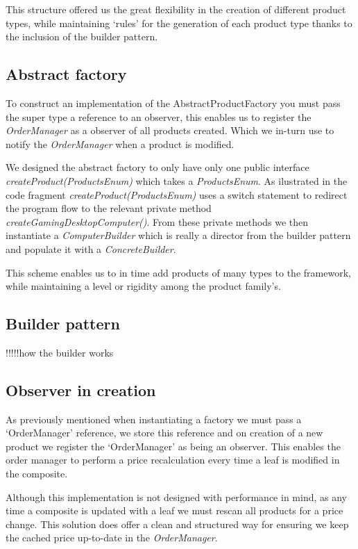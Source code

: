 \documentclass[pdftex,11pt,a4paper]{article}
\begin{document}
This structure offered us the great flexibility in the creation of different product types, while maintaining ‘rules’ for the generation of each product type thanks to the inclusion of the builder pattern.

\subsection{Abstract factory}

To construct an implementation of the AbstractProductFactory you must pass the super type a reference to an observer, this enables us to register the \emph{OrderManager} as a observer of all products created. Which we in-turn use to notify the \emph{OrderManager} when a product is modified.

We designed the abstract factory to only have only one public interface \emph{createProduct(ProductsEnum)} which takes a \emph{ProductsEnum}. As ilustrated in the code fragment \emph{createProduct(ProductsEnum)} uses a switch statement to redirect the program flow to the relevant private method \emph{createGamingDesktopComputer()}. From these private methods we then instantiate a \emph{ComputerBuilder} which is really a director from the builder pattern and populate it with a \emph{ConcreteBuilder}.

This scheme enables us to in time add products of many types to the framework, while maintaining a level or rigidity among the product family's.



\subsection{Builder pattern}

!!!!!how the builder works

\subsection{Observer in creation}
As previously mentioned when instantiating a factory we must pass a ‘OrderManager’ reference, we store this reference and on creation of a new product we register the ‘OrderManager’ as being an observer. This enables the order manager to perform a price recalculation every time a leaf is modified in the composite.

Although this implementation is not designed with performance in mind, as any time a composite is updated with a leaf we must rescan all products for a price change. This solution does offer a clean and structured way for ensuring we keep the cached price up-to-date in the \emph{OrderManager}.
\end{document}
